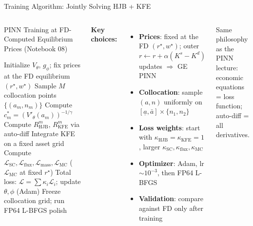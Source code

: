 \documentclass[aspectratio=169,11pt]{beamer}
\newcommand{\emphc}[1]{\textcolor{harvardcrimson}{#1}}
\newcommand{\ubar}[1]{\underline{#1}}
\begin{document}
\begin{frame}{Training Algorithm: Jointly Solving HJB + KFE}
\begin{columns}[T]
\begin{block}{PINN Training at FD-Computed Equilibrium Prices (Notebook 08)}
\footnotesize
\setlength{\itemsep}{0pt}
\begin{algorithmic}[1]
\STATE Initialize $V_\theta$, $g_\phi$; fix prices at the FD equilibrium $(r^\star, w^\star)$
    \STATE Sample $M$ collocation points $\{(a_m, n_m)\}$
    \STATE Compute $c_m^* = (V'_\theta(a_m))^{-1/\gamma}$
    \STATE Compute $R_{\text{HJB}}^m$, $R_{\text{KFE}}^m$ via auto-diff
    \STATE Integrate KFE on a fixed asset grid
    \STATE Compute $\mathcal{L}_{\text{SC}}, \mathcal{L}_{\text{flux}}, \mathcal{L}_{\text{mass}}, \mathcal{L}_{\text{MC}}$ \;\;($\mathcal{L}_{\text{MC}}$ at fixed $r^\star$)
    \STATE Total loss: $\mathcal{L} = \sum \kappa_i \mathcal{L}_i$;\; update $\theta,\phi$ (Adam)
\ENDFOR
\STATE Freeze collocation grid; run FP64 L-BFGS polish
\end{algorithmic}
\end{block}

\footnotesize
\textbf{Key choices:}
\begin{itemize}\itemsep0pt
    \item \textbf{Prices}: fixed at the FD $(r^\star, w^\star)$; outer $r\!\leftarrow\!r+\alpha(K^s\!-\!K^d)$ updates $\Rightarrow$ GE PINN
    \item \textbf{Collocation}: sample $(a,n)$ uniformly on $[\ubar{a}, \bar{a}] \times \{n_1, n_2\}$
    \item \textbf{Loss weights}: start with $\kappa_{\text{HJB}}=\kappa_{\text{KFE}}=1$, larger $\kappa_{\text{SC}},\kappa_{\text{flux}},\kappa_{\text{MC}}$
    \item \textbf{Optimizer}: Adam, lr $\sim 10^{-3}$, then FP64 L-BFGS
    \item \textbf{Validation}: compare against FD only after training
\end{itemize}

\begin{center}
\colorbox{uzhgreylight}{\parbox{0.95\columnwidth}{\centering\scriptsize
Same philosophy as the PINN lecture: \emphc{economic equations = loss function};
\emphc{auto-diff = all derivatives}.}}
\end{center}
\end{columns}
\end{frame}
\end{document}
